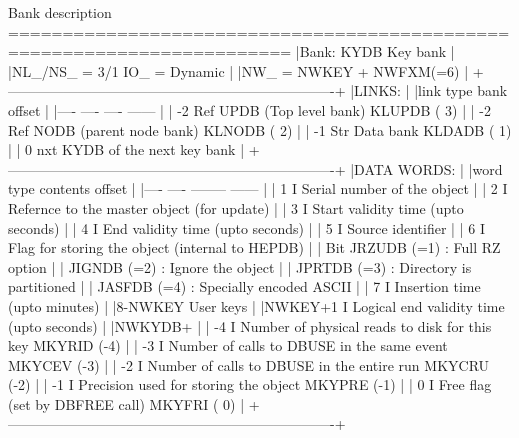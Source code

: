 \begin{XMPt}{Bank description}
========================================================================
|Bank:  KYDB                                                  Key bank |
|NL_/NS_ =  3/1                                          IO_ = Dynamic |
|NW_     =  NWKEY + NWFXM(=6)                                          |
+----------------------------------------------------------------------+
|LINKS:                                                                |
|link   type   bank                                        offset      |
|----   ----   ----                                        ------      |
| -2     Ref   UPDB (Top level bank)                       KLUPDB ( 3) |
| -2     Ref   NODB (parent node bank)                     KLNODB ( 2) |
| -1     Str   Data bank                                   KLDADB ( 1) |
|  0     nxt   KYDB of the next key bank                               |
+----------------------------------------------------------------------+
|DATA WORDS:                                                           |
|word  type  contents                                      offset      |
|----  ----  --------                                      ------      |
|   1    I   Serial number of the object                               |
|   2    I   Refernce to the master object (for update)                |
|   3    I   Start validity time (upto seconds)                        |
|   4    I   End   validity time (upto seconds)                        |
|   5    I   Source identifier                                         |
|   6    I   Flag for storing the object (internal to HEPDB)           |
|             Bit JRZUDB (=1) : Full RZ option                         |
|                 JIGNDB (=2) : Ignore the object                      |
|                 JPRTDB (=3) : Directory is partitioned               |
|                 JASFDB (=4) : Specially encoded ASCII                |
|   7    I   Insertion time (upto minutes)                             |
|8-NWKEY     User keys                                                 |
|NWKEY+1 I   Logical end validity time (upto seconds)                  |
|NWKYDB+                                                               |
|  -4    I   Number of physical reads to disk for this key MKYRID (-4) |
|  -3    I   Number of calls to DBUSE in the same event    MKYCEV (-3) |
|  -2    I   Number of calls to DBUSE in the entire run    MKYCRU (-2) |
|  -1    I   Precision used for storing the object         MKYPRE (-1) |
|   0    I   Free flag (set by DBFREE call)                MKYFRI ( 0) |
+----------------------------------------------------------------------+



\end{XMPt}
